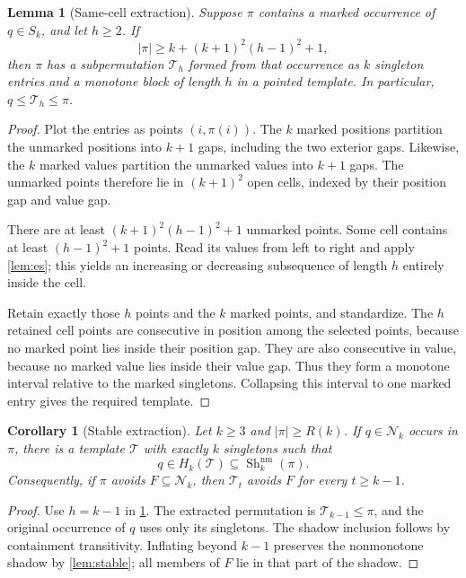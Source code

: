 \documentclass[11pt,a4paper]{article}
\newtheorem{lemma}[theorem]{Lemma}
\newtheorem{corollary}[theorem]{Corollary}
\theoremstyle{definition}
\theoremstyle{remark}
\DeclareMathOperator{\Sh}{Sh}
\newcommand{\Nk}{\mathcal N_k}
\newcommand{\Tm}{\mathcal T}
\newcommand{\replybound}{R(k)}
\newcommand{\shn}[1]{\Sh_k^{\mathrm{nm}}(#1)}
\begin{document}
\begin{lemma}[Same-cell extraction]\label{lem:extract}
Suppose $\pi$ contains a marked occurrence of $q\in S_k$, and let $h\ge2$.
If
\begin{equation}\label{eq:extractionbound}
 |\pi|\ge k+(k+1)^2(h-1)^2+1,
\end{equation}
then $\pi$ has a subpermutation $\Tm_h$ formed from that occurrence as $k$
singleton entries and a monotone block of length $h$ in a pointed template.
In particular, $q\le\Tm_h\le\pi$.
\end{lemma}
\begin{proof}
Plot the entries as points $(i,\pi(i))$. The $k$ marked positions partition
the unmarked positions into $k+1$ gaps, including the two exterior gaps.
Likewise, the $k$ marked values partition the unmarked values into $k+1$
gaps. The unmarked points therefore lie in $(k+1)^2$ open cells, indexed by
their position gap and value gap.

There are at least $(k+1)^2(h-1)^2+1$ unmarked points. Some cell contains
at least $(h-1)^2+1$ points. Read its values from left to right and apply
\cref{lem:es}; this yields an increasing or decreasing subsequence of length
$h$ entirely inside the cell.

Retain exactly those $h$ points and the $k$ marked points, and standardize.
The $h$ retained cell points are consecutive in position among the selected
points, because no marked point lies inside their position gap. They are
also consecutive in value, because no marked value lies inside their value
gap. Thus they form a monotone interval relative to the marked singletons.
Collapsing this interval to one marked entry gives the required template.
\end{proof}

\begin{corollary}[Stable extraction]\label{cor:extract}
Let $k\ge3$ and $|\pi|\ge\replybound$. If $q\in\Nk$ occurs in $\pi$, there is
a template $\Tm$ with exactly $k$ singletons such that
\[
 q\in H_k(\Tm)\subseteq\shn{\pi}.
\]
Consequently, if $\pi$ avoids $F\subseteq\Nk$, then $\Tm_t$ avoids $F$ for
every $t\ge k-1$.
\end{corollary}
\begin{proof}
Use $h=k-1$ in \cref{lem:extract}. The extracted permutation is
$\Tm_{k-1}\le\pi$, and the original occurrence of $q$ uses only its
singletons. The shadow inclusion follows by containment transitivity.
Inflating beyond $k-1$ preserves the nonmonotone shadow by
\cref{lem:stable}; all members of $F$ lie in that part of the shadow.
\end{proof}
\end{document}

